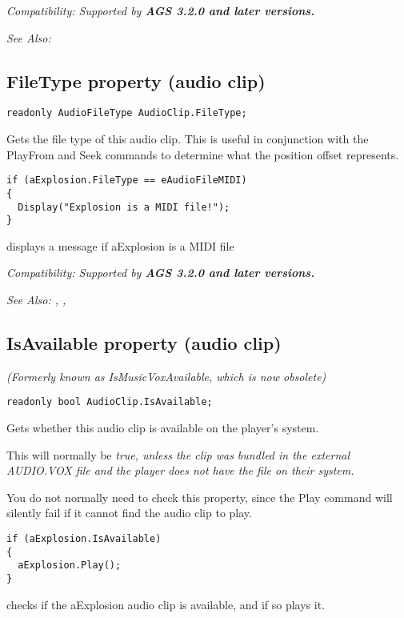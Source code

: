 \it{Compatibility:} Supported by \bf{AGS 3.2.0} and later versions.

\it{See Also:} 


\subsection{FileType property (audio clip)}\label{AudioClip.FileType}%

\begin{verbatim}
readonly AudioFileType AudioClip.FileType;
\end{verbatim}
Gets the file type of this audio clip. This is useful in conjunction with the PlayFrom
and Seek commands to determine what the position offset represents.

\begin{verbatim}
if (aExplosion.FileType == eAudioFileMIDI)
{
  Display("Explosion is a MIDI file!");
}
\end{verbatim}
displays a message if aExplosion is a MIDI file

\it{Compatibility:} Supported by \bf{AGS 3.2.0} and later versions.

\it{See Also:} ,
,


\subsection{IsAvailable property (audio clip)}\label{AudioClip.IsAvailable}%

\it{(Formerly known as IsMusicVoxAvailable, which is now obsolete)}

\begin{verbatim}
readonly bool AudioClip.IsAvailable;
\end{verbatim}
Gets whether this audio clip is available on the player's system.

This will normally be \it{true}, unless the clip was bundled in the external AUDIO.VOX
file and the player does not have the file on their system.

You do not normally need to check this property, since the Play command will silently
fail if it cannot find the audio clip to play.

\begin{verbatim}
if (aExplosion.IsAvailable)
{
  aExplosion.Play();
}
\end{verbatim}
checks if the aExplosion audio clip is available, and if so plays it.

